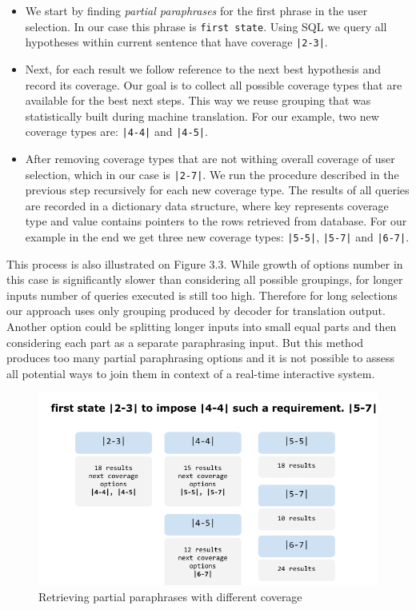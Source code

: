 \begin{itemize}
    \item We start by finding \emph{partial paraphrases} for the first phrase in the user selection. In our case this phrase is \texttt{first state}. Using SQL we query all hypotheses within current sentence that have coverage \texttt{|2-3|}. 
    \item Next, for each result we follow reference to the next best hypothesis and record its coverage. Our goal is to collect all possible coverage types that are available for the best next steps. This way we reuse grouping that was statistically built during machine translation. For our example, two new coverage types are: \texttt{|4-4|} and \texttt{|4-5|}.
    \item After removing coverage types that are not withing overall coverage of user selection, which in our case is \texttt{|2-7|}. We run the procedure described in the previous step recursively for each new coverage type. The results of all queries are recorded in a dictionary data structure, where key represents coverage type and value contains pointers to the rows retrieved from database. For our example in the end we get three new coverage types: \texttt{|5-5|}, \texttt{|5-7|} and \texttt{|6-7|}. 
\end{itemize}

This process is also illustrated on Figure 3.3. While growth of options number in this case is significantly slower than considering all possible groupings, for longer inputs number of queries executed is still too high. Therefore for long selections our approach uses only grouping produced by decoder for translation output. Another option could be splitting longer inputs into small equal parts and then considering each part as a separate paraphrasing input. But this method produces too many partial paraphrasing options and it is not possible to assess all potential ways to join them in context of a real-time interactive system. 
 
\begin{figure}
 \centering 
 \includegraphics{g/coverage-expansion.pdf}
 \caption{Retrieving partial paraphrases with different coverage}
\end{figure}

